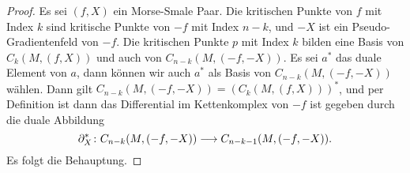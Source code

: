 \begin{proof}
    Es sei $(f, X)$ ein Morse-Smale Paar. Die kritischen Punkte von $f$ mit Index $k$ sind kritische Punkte
    von $-f$ mit Index $n - k$, und $-X$ ist ein Pseudo-Gradientenfeld von $-f$. Die kritischen Punkte 
    $p$ mit Index $k$ bilden eine Basis von $C_k (M, (f, X))$ und auch von $C_{n - k}(M, (-f, -X))$.
    Es sei $a^{\ast}$ das duale Element von $a$, dann können wir auch $a^{\ast}$ als Basis von 
    $C_{n - k}(M, (-f, -X))$ wählen. Dann gilt $C_{n - k} (M, (-f, -X)) = (C_k (M, (f, X)))^{\ast}$,
    und per Definition ist dann das Differential im Kettenkomplex von $-f$ ist gegeben durch die duale Abbildung
    \[ { \partial }_X^{\ast} \colon C_{n - k} (M, (-f, -X)) \longrightarrow C_{n - k - 1} (M, (-f, -X)) . \]
    Es folgt die Behauptung.
\end{proof}
